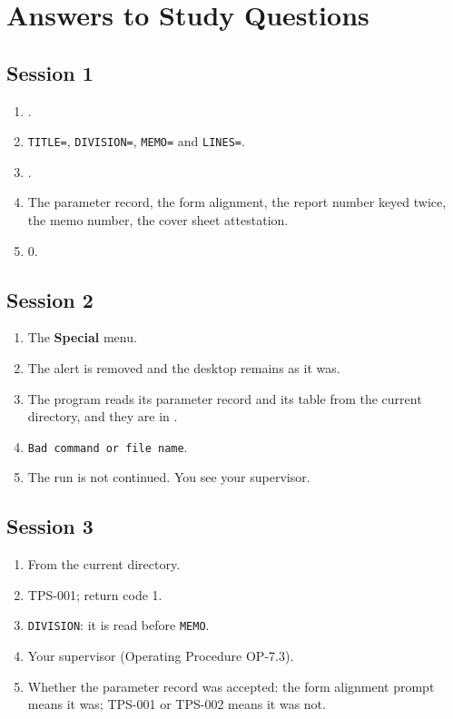 \chapter{Answers to Study Questions}

\section{Session 1}
\begin{enumerate}
\item {}.
\item \texttt{TITLE=}, \texttt{DIVISION=}, \texttt{MEMO=} and \texttt{LINES=}.
\item {}.
\item The parameter record, the form alignment, the report number keyed
  twice, the memo number, the cover sheet attestation.
\item 0.
\end{enumerate}

\section{Session 2}
\begin{enumerate}
\item The \textbf{Special} menu.
\item The alert is removed and the desktop remains as it was.
\item The program reads its parameter record and its table from the current
  directory, and they are in .
\item \texttt{Bad command or file name}.
\item The run is not continued.  You see your supervisor.
\end{enumerate}

\section{Session 3}
\begin{enumerate}
\item From the current directory.
\item TPS-001; return code 1.
\item \texttt{DIVISION}: it is read before \texttt{MEMO}.
\item Your supervisor (Operating Procedure OP-7.3).
\item Whether the parameter record was accepted: the form alignment prompt
  means it was; TPS-001 or TPS-002 means it was not.
\end{enumerate}

